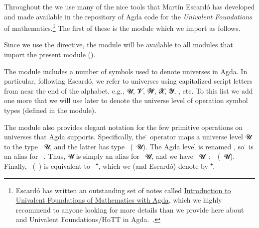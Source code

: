 Throughout the \agdaualib we use many of the nice tools that Martín Escardó has developed and made available in the \typetopology
repository of Agda code for the \emph{Univalent Foundations} of mathematics.\footnote{%
Escardó has written an outstanding set of notes called
\href{https://www.cs.bham.ac.uk/~mhe/HoTT-UF-in-Agda-Lecture-Notes/index.html}{Introduction to Univalent Foundations of Mathematics with Agda}, which we highly recommend to anyone looking for more details than we provide
here about \mltt and Univalent Foundations/HoTT in Agda.~\cite{MHE}.}
The first of these is the  module which we import as follows.
\ccpad
\begin{code}%
\>[0]\AgdaSpace{}%
\AgdaSpace{}%
\AgdaSpace{}%
\<%
\end{code}
\ccpad
Since we use the  directive, the  module will be available to all modules that import
the present module ().

The  module includes a number of symbols used to denote universes in Agda. In particular, following Escardó, we refer to universes using capitalized script letters from near the end of the alphabet, e.g., \ab 𝓤, \ab 𝓥, \ab 𝓦, \ab 𝓧, \ab 𝓨, , etc. To this list we add one more that we will use later to denote the universe level of operation symbol types (defined in the  module).
\ccpad
\begin{code}%
\>[0]\AgdaSpace{}%
\AgdaSpace{}%
\AgdaSymbol{:}\AgdaSpace{}%
\<%
\end{code}
\ccpad
The  module also provides elegant notation for the few primitive operations on universes that Agda supports. Specifically, the \af ̇ operator maps a universe level \ab 𝓤 to the type ~\ab 𝓤, and the latter has type ~(~\ab 𝓤). The Agda level  is renamed , so \af ̇ is an alias for ~. Thus, \ab 𝓤\af ̇ is simply an alias for ~\ab 𝓤, and we have ~\ab 𝓤~\as :~~(~\ab 𝓤). Finally, ~(~) is equivalent to ~\af ⁺, which we (and Escardó) denote by \af ⁺\af ̇.


